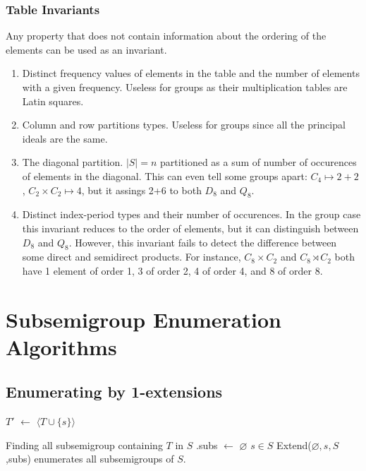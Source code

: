 \documentclass{amsart}
\theoremstyle{plain}
\theoremstyle{definition}
\begin{document}
\subsubsection{Table Invariants}

Any property that does not contain information about the ordering of the elements can be used as an invariant.
\begin{enumerate}
\item Distinct frequency values of elements in the table and the number of elements with a given frequency. Useless for groups as their multiplication tables are Latin squares.
\item Column and row partitions types.   Useless for groups since all the principal ideals are the same.
\item The diagonal partition. $|S|=n$ partitioned as a sum of number of occurences of elements in the diagonal. This can even tell some groups apart: $C_4\mapsto 2+2$, $C_2\times C_2\mapsto 4$, but it assings 2+6 to both $D_8$ and $Q_8$.
\item Distinct index-period types and their number of occurences. In the group case this invariant reduces to the order of elements, but it can distinguish between $D_8$ and $Q_8$. However, this invariant fails to detect the difference between some direct and semidirect products. For instance, $C_8\times C_2$ and $C_8\rtimes C_2$ both have 1 element of order 1, 3 of order 2, 4 of order 4, and 8 of order 8.
\end{enumerate} 







\section{Subsemigroup Enumeration Algorithms}

\subsection{Enumerating by 1-extensions}

\begin{algorithm}
\BlankLine
\Name{}

$T'$ $\leftarrow$ $\langle T\cup\{s\}\rangle$\\
\caption{Finding all subsemigroup containing $T$ in $S$ .\textsf{subs} $\leftarrow$ $\varnothing$ $s\in S$ \textsf{Extend}($\varnothing,s,S$,\textsf{subs}) enumerates all subsemigroups of $S$.}
\label{alg:1-extensons}
\end{algorithm}
\end{document}
